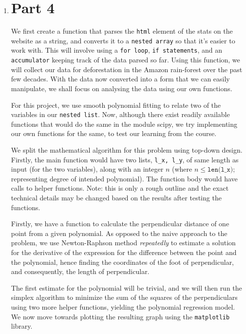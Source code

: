 \documentclass[12pt]{article}
\begin{document}
\begin{enumerate}
\item \section*{Part 4}

\begin{text}

We first create a function that parses the \texttt{html} element of the stats on the website as a string, and converts it to a \texttt{nested array} so that it’s easier to work with. This will involve using a \texttt{for loop}, \texttt{if statements}, and an \texttt{accumulator} keeping track of the data parsed so far. Using this function, we will collect our data for deforestation in the Amazon rain-forest over the past few decades. With the data now converted into a form that we can easily manipulate, we shall focus on analysing the data using our own functions.

For this project, we use smooth polynomial fitting to relate two of the variables in our \texttt{nested list}. Now, although there exist readily available functions that would do the same in the module scipy, we try implementing our own functions for the same, to test our learning from the course.

We split the mathematical algorithm for this problem using top-down design. Firstly, the main function would have two lists, \texttt{l\_x, l\_y}, of same length as input (for the two variables), along with an integer $n$ (where $n \leq \texttt{len(l\_x)}$; representing degree of intended polynomial). The function body would have calls to helper functions. Note: this is only a rough outline and the exact technical details may be changed based on the results after testing the functions.

Firstly, we have a function to calculate the perpendicular distance of one point from a given polynomial. As opposed to the naive approach to the problem, we use Newton-Raphson method \textit{repeatedly} to estimate a solution for the derivative of the expression for the difference between the point and the polynomial, hence finding the coordinates of the foot of perpendicular, and consequently, the length of perpendicular.

The first estimate for the polynomial will be trivial, and we will then run the simplex algorithm to minimize the sum of the squares of the perpendiculars using two more helper functions, yielding the polynomial regression model. We now move towards plotting the resulting graph using the \texttt{matplotlib} library.


\end{text}
\end{enumerate}
\end{document}
